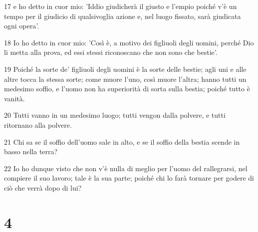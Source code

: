 \par 17 e ho detto in cuor mio: 'Iddio giudicherà il giusto e l'empio poiché v'è un tempo per il giudicio di qualsivoglia azione e, nel luogo fissato, sarà giudicata ogni opera'.
\par 18 Io ho detto in cuor mio: 'Così è, a motivo dei figliuoli degli uomini, perché Dio li metta alla prova, ed essi stessi riconoscano che non sono che bestie'.
\par 19 Poiché la sorte de' figliuoli degli uomini è la sorte delle bestie; agli uni e alle altre tocca la stessa sorte; come muore l'uno, così muore l'altra; hanno tutti un medesimo soffio, e l'uomo non ha superiorità di sorta sulla bestia; poiché tutto è vanità.
\par 20 Tutti vanno in un medesimo luogo; tutti vengon dalla polvere, e tutti ritornano alla polvere.
\par 21 Chi sa se il soffio dell'uomo sale in alto, e se il soffio della bestia scende in basso nella terra?
\par 22 Io ho dunque visto che non v'è nulla di meglio per l'uomo del rallegrarsi, nel compiere il suo lavoro; tale è la sua parte; poiché chi lo farà tornare per godere di ciò che verrà dopo di lui?

\chapter{4}

